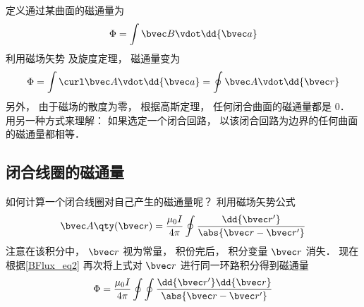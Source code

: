 
定义通过某曲面的磁通量为
\begin{equation}
\Phi  = \int \bvec B \vdot \dd{\bvec a}
\end{equation}
利用磁场矢势%
及旋度定理， %
磁通量变为
\begin{equation} \label{BFlux_eq2}
\Phi  = \int \curl \bvec A \vdot \dd{\bvec a}  = \oint \bvec A \vdot \dd{\bvec r}
\end{equation}
另外， 由于磁场的散度为零， 根据高斯定理， 任何闭合曲面的磁通量都是 0． 用另一种方式来理解： 如果选定一个闭合回路， 以该闭合回路为边界的任何曲面的磁通量都相等．

\subsection{闭合线圈的磁通量}

如何计算一个闭合线圈对自己产生的磁通量呢？ 利用磁场矢势公式
\begin{equation}
\bvec A \qty(\bvec r) = \frac{\mu_0 I}{4 \pi} \oint \frac{\dd{\bvec r'}}{\abs{\bvec r - \bvec r'}}
\end{equation}
注意在该积分中， $\bvec r$ 视为常量， 积份完后， 积分变量 $\bvec r$ 消失． 现在根据\autoref{BFlux_eq2} 再次将上式对 $\bvec r$ 进行同一环路积分得到磁通量
\begin{equation}
\Phi  = \frac{\mu_0 I}{4\pi} \oint\oint \frac{\dd{\bvec r'} \dd{\bvec r}}{\abs{\bvec r - \bvec r'}}
\end{equation}
